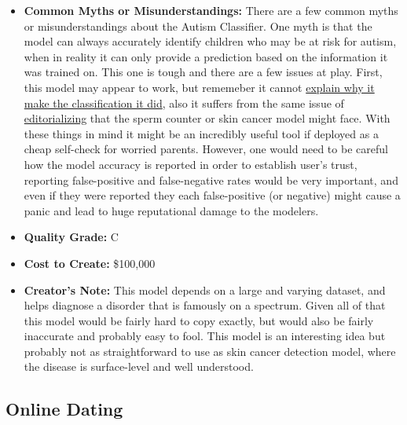 \begin{itemize}
    \item \textbf{Common Myths or Misunderstandings:}  There are a few common myths or misunderstandings about the Autism Classifier. One myth is that the model can always accurately identify children who may be at risk for autism, when in reality it can only provide a prediction based on the information it was trained on. This one is tough and there are a few issues at play. First, this model may appear to work, but rememeber it cannot \hyperref[sec:explain]{explain why it make the classification it did}, also it suffers from the same issue of \hyperref[sec:janitor]{editorializing} that the sperm counter or skin cancer model might face. With these things in mind it might be an incredibly useful tool if deployed as a cheap self-check for worried parents. However, one would need to be careful how the model accuracy is reported in order to establish user's trust, reporting false-positive and false-negative rates would be very important, and even if they were reported they each false-positive (or negative) might cause a panic and lead to huge reputational damage to the modelers.   
    \item \textbf{Quality Grade:} C
    \item \textbf{Cost to Create:} \$100,000
    \item \textbf{Creator's Note:} This model depends on a large and varying dataset, and helps diagnose a disorder that is famously on a spectrum. Given all of that this model would be fairly hard to copy exactly, but would also be fairly inaccurate and probably easy to fool. This model is an interesting idea but probably not as straightforward to use as skin cancer detection model, where the disease is surface-level and well understood.
\end{itemize}

\subsection{Online Dating}

